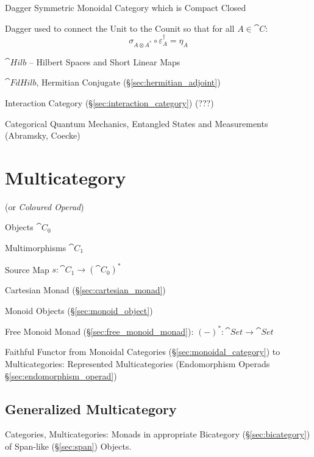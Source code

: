 Dagger Symmetric Monoidal Category which is Compact Closed

Dagger used to connect the Unit to the Counit so that for all $A \in
\cat{C}$:
\[
  \sigma_{A \otimes A^*} \circ \varepsilon_A^\dag = \eta_A
\]

$\cat{Hilb}$ -- Hilbert Spaces and Short Linear Maps

$\cat{FdHilb}$, Hermitian Conjugate (\S\ref{sec:hermitian_adjoint})

Interaction Category (\S\ref{sec:interaction_category}) (???)

Categorical Quantum Mechanics, Entangled States and Measurements
(Abramsky, Coecke)



\section{Multicategory}\label{sec:multicategory}

(or \emph{Coloured Operad})

Objects $\cat{C}_0$

Multimorphisms $\cat{C}_1$

Source Map $s : \cat{C}_1 \rightarrow (\cat{C}_0)^*$

Cartesian Monad (\S\ref{sec:cartesian_monad})

Monoid Objects (\S\ref{sec:monoid_object})

Free Monoid Monad (\S\ref{sec:free_monoid_monad}): $(-)^* : \cat{Set}
\rightarrow \cat{Set}$

Faithful Functor from Monoidal Categories
(\S\ref{sec:monoidal_category}) to Multicategories: Represented
Multicategories (Endomorphism Operads \S\ref{sec:endomorphism_operad})



\subsection{Generalized Multicategory}
\label{sec:generalized_multicategory}

Categories, Multicategories: Monads in appropriate Bicategory
(\S\ref{sec:bicategory}) of Span-like (\S\ref{sec:span}) Objects.


